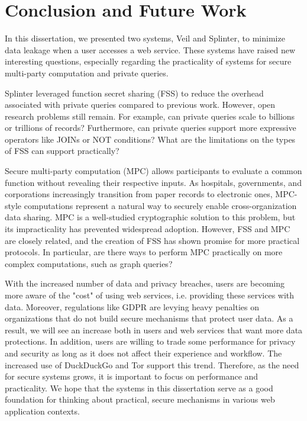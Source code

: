 \section{Conclusion and Future Work}
\label{chap:concl}

In this dissertation, we presented two systems, Veil and Splinter,
to minimize data leakage when a user accesses a web service. 
These systems have raised new interesting questions,
especially regarding the practicality of 
systems for secure multi-party computation and private queries.

Splinter leveraged
function secret sharing (FSS) to reduce the overhead associated with private queries compared to previous
work. However, open research problems still remain. For example, can private queries scale to billions
or trillions of records? Furthermore, can private queries support more expressive operators like JOINs or
NOT conditions? What are the limitations on the types of FSS can support practically?

Secure multi-party computation (MPC) allows participants to evaluate a common function without revealing
their respective inputs. As hospitals, governments, and corporations increasingly transition from
paper records to electronic ones, MPC-style computations represent a natural way to securely enable
cross-organization data sharing. MPC is a well-studied cryptographic solution to this problem, but its
impracticality has prevented widespread adoption. However, FSS and MPC are closely related, and 
the creation of FSS has shown promise for more practical protocols. In particular,
are there ways to perform MPC practically on more complex computations, such as graph queries?

With the increased number of data and privacy breaches, users are becoming
more aware of the "cost" of using web services, i.e. providing these services
with data. Moreover, regulations like
GDPR are levying heavy penalties on organizations that do not build
secure mechanisms that protect user data. As a result, we will see
an increase both in users and web services that want more data protections.
In addition, users are willing to trade some performance for privacy and security
as long as it does not affect their experience and workflow. The increased
use of DuckDuckGo and Tor support this trend. Therefore,
as the need for secure systems grows, it is important to focus on performance
and practicality. We hope that the systems in this dissertation serve
as a good foundation for thinking about practical, secure mechanisms
in various web application contexts.